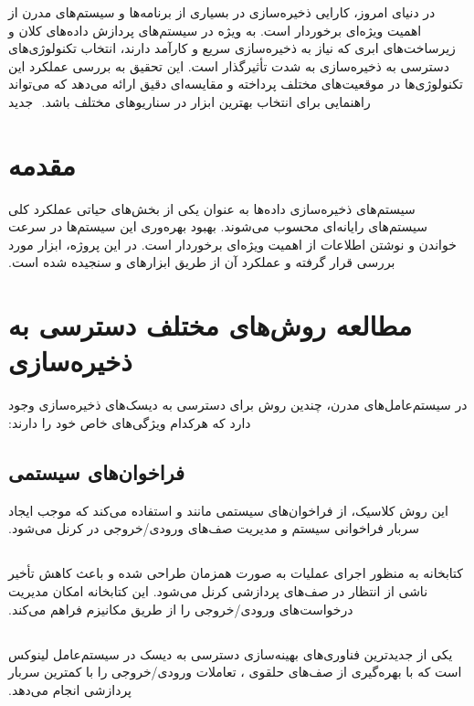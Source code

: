 ‫
‫در دنیای امروز، کارایی ذخیره‌سازی در بسیاری از برنامه‌ها و سیستم‌های مدرن از اهمیت ویژه‌ای برخوردار است. به ویژه در سیستم‌های پردازش داده‌های کلان و زیرساخت‌های ابری که نیاز به ذخیره‌سازی سریع و کارآمد دارند، انتخاب تکنولوژی‌های دسترسی به ذخیره‌سازی به شدت تأثیرگذار است. این تحقیق به بررسی عملکرد این تکنولوژی‌ها در موقعیت‌های مختلف پرداخته و مقایسه‌ای دقیق ارائه می‌دهد که می‌تواند راهنمایی برای انتخاب بهترین ابزار در سناریوهای مختلف باشد.
‫
‫‌جدید
‫
‫\section{مقدمه}
‫سیستم‌های ذخیره‌سازی داده‌ها به عنوان یکی از بخش‌های حیاتی عملکرد کلی سیستم‌های رایانه‌ای محسوب می‌شوند. بهبود بهره‌وری این سیستم‌ها در سرعت خواندن و نوشتن اطلاعات از اهمیت ویژه‌ای برخوردار است. در این پروژه، ابزار  مورد بررسی قرار گرفته و عملکرد آن از طریق ابزارهای  و  سنجیده شده است.
‫
‫\section*{مطالعه روش‌های مختلف دسترسی به ذخیره‌سازی}
‫در سیستم‌عامل‌های مدرن، چندین روش برای دسترسی به دیسک‌های ذخیره‌سازی وجود دارد که هرکدام ویژگی‌های خاص خود را دارند:
‫
‫\subsection*{فراخوان‌های سیستمی }
‫این روش کلاسیک، از فراخوان‌های سیستمی مانند  و  استفاده می‌کند که موجب ایجاد سربار فراخوانی سیستم و مدیریت صف‌های ورودی/خروجی در کرنل می‌شود.
‫
‫\subsection*{}
‫کتابخانه  به منظور اجرای عملیات  به صورت همزمان طراحی شده و باعث کاهش تأخیر ناشی از انتظار در صف‌های پردازشی کرنل می‌شود. این کتابخانه امکان مدیریت درخواست‌های ورودی/خروجی را از طریق مکانیزم  فراهم می‌کند.
‫
‫\subsection*{}
‫ یکی از جدیدترین فناوری‌های بهینه‌سازی دسترسی به دیسک در سیستم‌عامل لینوکس است که با بهره‌گیری از صف‌های حلقوی ، تعاملات ورودی/خروجی را با کمترین سربار پردازشی انجام می‌دهد.
‫
‫\subsection*{}
